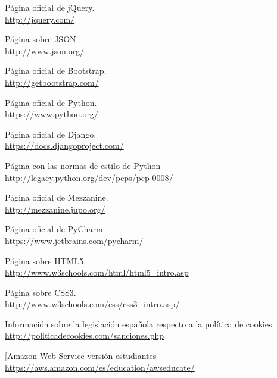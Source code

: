 
\cleardoublepage

\begin{thebibliography}{25}


 Página oficial de jQuery.    \\
{\footnotesize \url{http://jquery.com/}}

 Página sobre JSON.    \\
{\footnotesize
\url{http://www.json.org/}}


 Página oficial de Bootstrap.    \\
{\footnotesize
\url{http://getbootstrap.com/}}

 Página oficial de Python.     \\
{\footnotesize
\url{https://www.python.org/}}

 Página oficial de Django.      \\
{\footnotesize
\url{https://docs.djangoproject.com/}}

 Página con las normas de estilo de Python     \\
{\footnotesize
\url{http://legacy.python.org/dev/peps/pep-0008/}}

 Página oficial de Mezzanine.   \\
{\footnotesize
\url{http://mezzanine.jupo.org/}}

 Página oficial de PyCharm    \\
{\footnotesize
\url{https://www.jetbrains.com/pycharm/}}

 Página sobre HTML5.    \\
{\footnotesize
\url{http://www.w3schools.com/html/html5_intro.asp}}

 Página sobre CSS3.    \\
{\footnotesize
\url{http://www.w3schools.com/css/css3_intro.asp/ }}

 Información sobre la legislación española respecto a la política de cookies      \\
{\footnotesize
\url{http://politicadecookies.com/sanciones.php}}

[Amazon Web Service versión estudiantes
{\footnotesize
\url{https://aws.amazon.com/es/education/awseducate/ }}

\end{thebibliography}